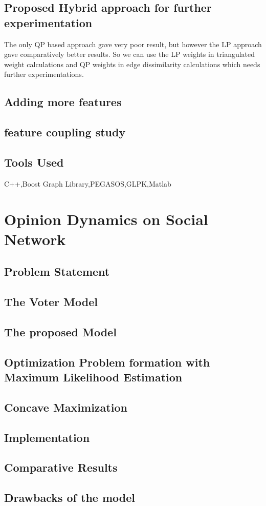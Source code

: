 \documentclass{article}
\begin{document}
\section*{Proposed Hybrid approach for further experimentation}
The only QP based approach gave very poor result, but however the LP approach gave comparatively better results. So we can use the LP weights in triangulated weight calculations and QP weights in edge dissimilarity calculations which needs further experimentations.

\section*{Adding more features}


\section*{feature coupling study}

\section*{Tools Used}
C++,Boost Graph Library,PEGASOS,GLPK,Matlab

\newpage
\chapter{Opinion Dynamics on Social Network}
\section*{Problem Statement}

\section*{The Voter Model}

\section*{The proposed Model}

\section*{Optimization Problem formation with Maximum Likelihood Estimation}

\section*{Concave Maximization}
\section*{Implementation}

\section*{Comparative Results}
\section*{Drawbacks of the model}
\end{document}
